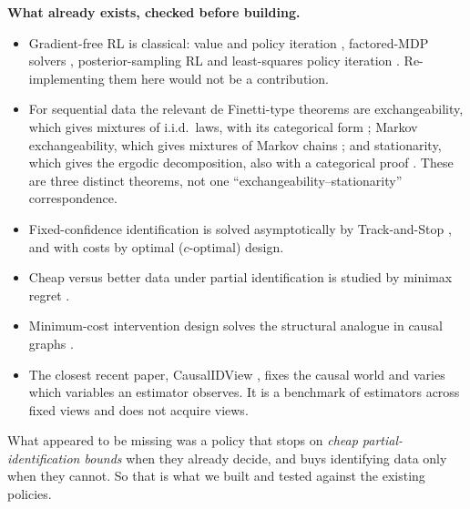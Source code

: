 \documentclass[11pt]{article}
\theoremstyle{definition}
\theoremstyle{remark}
\begin{document}
\textbf{What already exists, checked before building.}
\begin{itemize}
  \item Gradient-free RL is classical: value and policy iteration \cite{bellman57,howard60}, factored-MDP solvers \cite{guestrin03}, posterior-sampling RL \cite{osband13} and least-squares policy iteration \cite{lagoudakisparr03}. Re-implementing them here would not be a contribution.
  \item For sequential data the relevant de Finetti-type theorems are exchangeability, which gives mixtures of i.i.d.\ laws, with its categorical form \cite{fgp21}; Markov exchangeability, which gives mixtures of Markov chains \cite{diaconisfreedman80}; and stationarity, which gives the ergodic decomposition, also with a categorical proof \cite{mossperrone22}. These are three distinct theorems, not one ``exchangeability--stationarity'' correspondence.
  \item Fixed-confidence identification is solved asymptotically by Track-and-Stop \cite{garivierkaufmann16}, and with costs by optimal ($c$-optimal) design.
  \item Cheap versus better data under partial identification is studied by minimax regret \cite{dominitzmanski17}.
  \item Minimum-cost intervention design solves the structural analogue in causal graphs \cite{akbari22}.
  \item The closest recent paper, CausalIDView \cite{causalidview}, fixes the causal world and varies which variables an estimator observes. It is a benchmark of estimators across fixed views and does not acquire views.
\end{itemize}
What appeared to be missing was a policy that stops on \emph{cheap partial-identification bounds} when they already decide, and buys identifying data only when they cannot. So that is what we built and tested against the existing policies.
\end{document}
